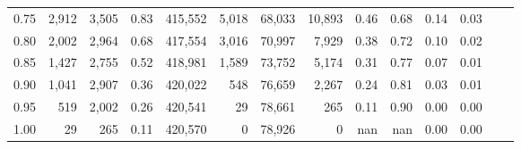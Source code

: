 \begin{tabular}{rrrrrrrrrrrrrr}
0.75 &   2,912 &  3,505 &    0.83 &  415,552 &    5,018 &  68,033 &  10,893 &  0.46 &  0.68 &  0.14 &      0.03 \\
0.80 &   2,002 &  2,964 &    0.68 &  417,554 &    3,016 &  70,997 &   7,929 &  0.38 &  0.72 &  0.10 &      0.02 \\
0.85 &   1,427 &  2,755 &    0.52 &  418,981 &    1,589 &  73,752 &   5,174 &  0.31 &  0.77 &  0.07 &      0.01 \\
0.90 &   1,041 &  2,907 &    0.36 &  420,022 &      548 &  76,659 &   2,267 &  0.24 &  0.81 &  0.03 &      0.01 \\
0.95 &     519 &  2,002 &    0.26 &  420,541 &       29 &  78,661 &     265 &  0.11 &  0.90 &  0.00 &      0.00 \\
1.00 &      29 &    265 &    0.11 &  420,570 &        0 &  78,926 &       0 &   nan &   nan &  0.00 &      0.00 \\
\bottomrule
\end{tabular}
